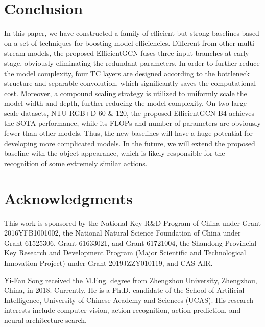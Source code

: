 \documentclass[10pt,journal,compsoc]{IEEEtran}
\begin{document}
\section{Conclusion}
\label{sec:conclusion}

In this paper, we have constructed a family of efficient but strong baselines based on a set of techniques for boosting model efficiencies. Different from other multi-stream models, the proposed EfficientGCN fuses three input branches at early stage, obviously eliminating the redundant parameters. In order to further reduce the model complexity, four TC layers are designed according to the bottleneck structure and separable convolution, which significantly saves the computational cost. Moreover, a compound scaling strategy is utilized to uniformly scale the model width and depth, further reducing the model complexity. On two large-scale datasets, NTU RGB+D 60 \& 120, the proposed EfficientGCN-B4 achieves the SOTA performance, while its FLOPs and number of parameters are obviously fewer than other models. Thus, the new baselines will have a huge potential for developing more complicated models. In the future, we will extend the proposed baseline with the object appearance, which is likely responsible for the recognition of some extremely similar actions.

\section*{Acknowledgments}

This work is sponsored by the National Key R\&D Program of China under Grant 2016YFB1001002, the National Natural Science Foundation of China under Grant 61525306, Grant 61633021, and Grant 61721004, the Shandong Provincial Key Research and Development Program (Major Scientific and Technological Innovation Project) under Grant 2019JZZY010119, and CAS-AIR.

{\small
  
  
}

\begin{IEEEbiography}{Yi-Fan Song}
received the M.Eng. degree from Zhengzhou University, Zhengzhou, China, in 2018. Currently, He is a Ph.D. candidate of the School of Artificial Intelligence, University of Chinese Academy and Sciences (UCAS). His research interests include computer vision, action recognition, action prediction, and neural architecture search.
\end{IEEEbiography}
\end{document}
